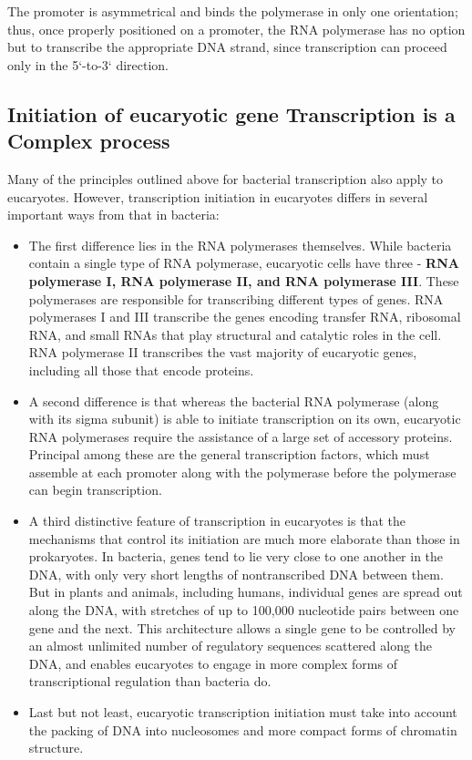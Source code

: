 The promoter is asymmetrical and binds the polymerase in only one orientation; thus, once properly
positioned on a promoter, the RNA polymerase has no option but to transcribe
the appropriate DNA strand, since transcription can proceed only
in the 5`-to-3` direction.

\subsection{Initiation of eucaryotic gene Transcription is a Complex process}

Many of the principles outlined above for bacterial transcription also
apply to eucaryotes. However, transcription initiation in eucaryotes differs
in several important ways from that in bacteria:

\begin{itemize}
\item The first difference lies in the RNA polymerases themselves. While
bacteria contain a single type of RNA polymerase, eucaryotic
cells have three - \textbf{RNA polymerase I, RNA polymerase II, and RNA
polymerase III}. These polymerases are responsible for transcribing
different types of genes. RNA polymerases I and III transcribe
the genes encoding transfer RNA, ribosomal RNA, and small RNAs
that play structural and catalytic roles in the cell.
RNA polymerase II transcribes the vast majority of eucaryotic genes,
including all those that encode proteins.
\item A second difference is that whereas the bacterial RNA polymerase
(along with its sigma subunit) is able to initiate transcription
on its own, eucaryotic RNA polymerases require the assistance of
a large set of accessory proteins. Principal among these are the
general transcription factors, which must assemble at each promoter
along with the polymerase before the polymerase can begin
transcription.
\item A third distinctive feature of transcription in eucaryotes is that
the mechanisms that control its initiation are much more elaborate
than those in prokaryotes. In bacteria, genes tend to lie very close to one another
in the DNA, with only very short lengths of nontranscribed DNA
between them. But in plants and animals, including humans, individual
genes are spread out along the DNA, with stretches of up
to 100,000 nucleotide pairs between one gene and the next. This
architecture allows a single gene to be controlled by an almost
unlimited number of regulatory sequences scattered along the
DNA, and enables eucaryotes to engage in more complex forms of
transcriptional regulation than bacteria do.
\item Last but not least, eucaryotic transcription initiation must take into
account the packing of DNA into nucleosomes and more compact
forms of chromatin structure.
\end{itemize}

